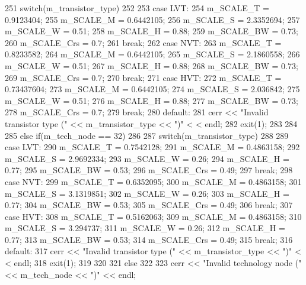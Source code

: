 \begin{DoxyCode}
{{251         switch(m_transistor_type)
252         {
253             case LVT:
254                 m_SCALE_T = 0.9123404;
255                 m_SCALE_M = 0.6442105;
256                 m_SCALE_S = 2.3352694;
257                 m_SCALE_W = 0.51;
258                 m_SCALE_H = 0.88;
259                 m_SCALE_BW = 0.73;
260                 m_SCALE_Crs = 0.7;
261                 break;
262             case NVT:
263                 m_SCALE_T = 0.8233582;
264                 m_SCALE_M = 0.6442105;
265                 m_SCALE_S = 2.1860558;
266                 m_SCALE_W = 0.51;
267                 m_SCALE_H = 0.88;
268                 m_SCALE_BW = 0.73;
269                 m_SCALE_Crs = 0.7;
270                 break;
271             case HVT:
272                 m_SCALE_T = 0.73437604;
273                 m_SCALE_M = 0.6442105;
274                 m_SCALE_S = 2.036842;
275                 m_SCALE_W = 0.51;
276                 m_SCALE_H = 0.88;
277                 m_SCALE_BW = 0.73;
278                 m_SCALE_Crs = 0.7;
279                 break;
280             default:
281                 cerr << "Invalid transistor type (" << m_transistor_type << ")" <
      < endl;
282                 exit(1);
283         }
284     }
285     else if(m_tech_node == 32)
286     {
287         switch(m_transistor_type)
288         {
289             case LVT:
290                 m_SCALE_T = 0.7542128;
291                 m_SCALE_M = 0.4863158;
292                 m_SCALE_S = 2.9692334;
293                 m_SCALE_W = 0.26;
294                 m_SCALE_H = 0.77;
295                 m_SCALE_BW = 0.53;
296                 m_SCALE_Crs = 0.49;
297                 break;
298             case NVT:
299                 m_SCALE_T = 0.6352095;
300                 m_SCALE_M = 0.4863158;
301                 m_SCALE_S = 3.1319851;
302                 m_SCALE_W = 0.26;
303                 m_SCALE_H = 0.77;
304                 m_SCALE_BW = 0.53;
305                 m_SCALE_Crs = 0.49;
306                 break;
307             case HVT:
308                 m_SCALE_T = 0.5162063;
309                 m_SCALE_M = 0.4863158;
310                 m_SCALE_S = 3.294737;
311                 m_SCALE_W = 0.26;
312                 m_SCALE_H = 0.77;
313                 m_SCALE_BW = 0.53;
314                 m_SCALE_Crs = 0.49;
315                 break;
316             default:
317                 cerr << "Invalid transistor type (" << m_transistor_type << ")" <
      < endl;
318                 exit(1);
319         }
320     }
321     else
322     {
323         cerr << "Invalid technology node (" << m_tech_node << ")" << endl;
}}
\end{DoxyCode}
